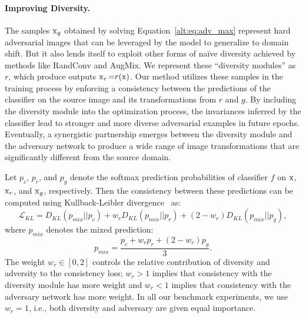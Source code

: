 \paragraph{Improving Diversity.}
The samples $\operatorname{\mathrm{x}}_g$ obtained by solving Equation~\ref{alt:eq:adv_max} represent hard adversarial images that can be leveraged by the model to generalize to domain shift. But it also lends itself to exploit other forms of na\"ive diversity achieved by methods like RandConv and AugMix.
We represent these ``diversity modules'' as $r$, which produce outputs $\operatorname{\mathrm{x}}_r{=}r(\operatorname{\mathrm{x}})$. Our method utilizes these samples in the training process by enforcing a consistency between the predictions of the classifier on the source image and its transformations from $r$ and $g$. By including the diversity module into the optimization process, the invariances inferred by the classifier lead to stronger and more diverse adversarial examples in future epochs. 
Eventually, a synergistic partnership emerges between the diversity module and the adversary network to produce a wide range of image transformations that are significantly different from the source domain.  

Let $p_c$, $p_r$, and $p_g$ denote the softmax prediction probabilities of classifier $f$ on $\operatorname{\mathrm{x}}$, $\operatorname{\mathrm{x}}_r$, and $\operatorname{\mathrm{x}}_g$, respectively. Then the consistency between these predictions can be computed using Kullback-Leibler divergence~\citep{kullback1951information} as:
\begin{equation}
    \mathcal{L}_{KL} = D_{KL}(p_{mix}||p_c) + w_r D_{KL}(p_{mix}||p_r) + (2-w_r) D_{KL}(p_{mix}||p_g), 
    \label{alt:eq:L_KL}
\end{equation}
where $p_{mix}$ denotes the mixed prediction:
\begin{equation}
    p_{mix} = \frac{p_c + w_r p_r + (2-w_r)p_g}{3}.
    \label{alt:eq:p_mix}
\end{equation}
The weight $w_r\in[0,2]$ controls the relative contribution of diversity and adversity to the consistency loss; $w_r>1$ implies that consistency with the diversity module has more weight and $w_r<1$ implies that consistency with the adversary network has more weight.
In all our benchmark experiments, we use $w_r=1$, i.e., both diversity and adversary are given equal importance.

